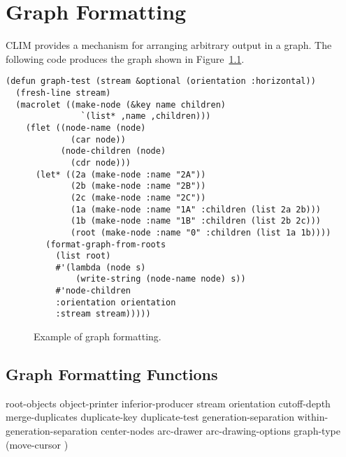 
\chapter {Graph Formatting}
\label {graph-formatting}

CLIM provides a mechanism for arranging arbitrary output in a graph.  The
following code produces the graph shown in Figure~\ref{graph-example}.

\begin{verbatim}
(defun graph-test (stream &optional (orientation :horizontal)) 
  (fresh-line stream)
  (macrolet ((make-node (&key name children)
               `(list* ,name ,children)))
    (flet ((node-name (node)
             (car node))
           (node-children (node)
             (cdr node)))
      (let* ((2a (make-node :name "2A"))
             (2b (make-node :name "2B"))
             (2c (make-node :name "2C"))
             (1a (make-node :name "1A" :children (list 2a 2b)))
             (1b (make-node :name "1B" :children (list 2b 2c)))
             (root (make-node :name "0" :children (list 1a 1b))))
        (format-graph-from-roots
          (list root)
          #'(lambda (node s)
              (write-string (node-name node) s))
          #'node-children
          :orientation orientation
          :stream stream)))))
\end{verbatim}

\begin{figure}
\centerline{}
\caption{\label{graph-example} Example of graph formatting.}
\end{figure}


\section {Graph Formatting Functions}

 {root-objects object-printer inferior-producer
                                  \key stream
                                       orientation cutoff-depth
                                       merge-duplicates duplicate-key duplicate-test
                                       generation-separation within-generation-separation
                                       center-nodes
                                       arc-drawer arc-drawing-options
                                       graph-type (move-cursor )}

